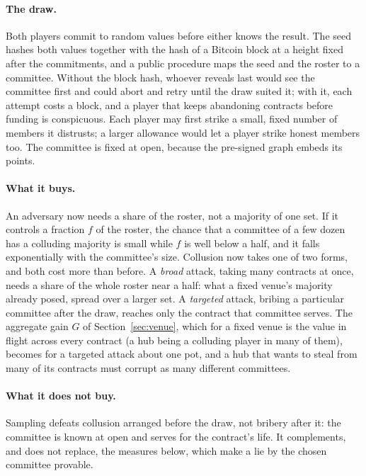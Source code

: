\documentclass[11pt]{article}
\begin{document}
\paragraph{The draw.} Both players commit to random values before
either knows the result. The seed hashes both values together with the
hash of a Bitcoin block at a height fixed after the commitments, and a
public procedure maps the seed and the roster to a committee. Without
the block hash, whoever reveals last would see the committee first and
could abort and retry until the draw suited it; with it, each attempt
costs a block, and a player that keeps abandoning contracts before
funding is conspicuous. Each player may first strike a small, fixed
number of members it distrusts; a larger allowance would let a player
strike honest members too. The committee is fixed at open, because the
pre-signed graph embeds its points.

\paragraph{What it buys.} An adversary now needs a share of the
roster, not a majority of one set. If it controls a fraction $f$ of the
roster, the chance that a committee of a few dozen has a colluding
majority is small while $f$ is well below a half, and it falls
exponentially with the committee's size. Collusion now
takes one of two forms, and both cost more than before. A \emph{broad}
attack, taking many contracts at once, needs a share of the whole
roster near a half: what a fixed venue's majority
already posed, spread over a larger set. A \emph{targeted} attack,
bribing a particular committee after the draw, reaches only the
contract that committee serves. The aggregate gain $G$ of
Section~\ref{sec:venue}, which for a fixed venue is the value in flight
across every contract (a hub being a colluding player in many of them),
becomes for a targeted attack about one pot, and a hub that wants to
steal from many of its contracts must corrupt as many different
committees.

\paragraph{What it does not buy.} Sampling defeats collusion arranged
before the draw, not bribery after it: the committee is known at open
and serves for the contract's life. It complements, and does not
replace, the measures below, which make a lie by the chosen committee
provable.
\end{document}
